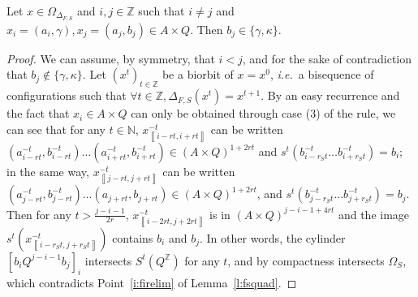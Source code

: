 \documentclass{jac}
\newcommand{\Z}{\mathbb Z}
\newcommand{\N}{\mathbb N}
\newcommand{\oo}[2]{\left\rrbracket #1,#2\right\llbracket}
\newcommand{\cc}[2]{\left\llbracket #1,#2\right\rrbracket}
\newcommand{\scc}[2]{_{\cc{#1}{#2}}}\newcommand{\soo}[2]{_{\oo{#1}{#2}}}\newcommand{\co}[2]{\left\llbracket #1,#2\right\llbracket}\newcommand{\sco}[2]{_{\co{#1}{#2}}}\newcommand{\kaprx}[1]{\mathcal A_{#1}}
\newcommand{\ie}{\textit{i.e.}\ }
\theoremstyle{definition}
\begin{document}
\begin{lem}\label{l:fire}
 Let $x\in\Omega_{\Delta_{F,S}}$ and $i,j\in\Z$ such that $i\ne j$ and $x_i=(a_i,\gamma),x_j=(a_j,b_j)\in A\times Q$.
Then $b_j\in\{\gamma,\kappa\}$.
\end{lem}
\begin{proof}
We can assume, by symmetry, that $i<j$, and for the sake of contradiction that $b_j\notin\{\gamma,\kappa\}$.
Let $(x^t)_{t\in\Z}$ be a biorbit of $x=x^0$, \ie a bisequence of configurations such that $\forall t\in\Z,\Delta_{F,S}(x^t)=x^{t+1}$. By an easy recurrence and the fact that $x_i\in A\times Q$ can only be obtained through case (3) of the rule, we can see that for any $t\in\N$, $x^{-t}\scc{i-rt}{i+rt}$ can be written $(a^{-t}_{i-rt},b^{-t}_{i-rt})\ldots(a^{-t}_{i+rt},b^{-t}_{i+rt})\in(A\times Q)^{1+2rt}$ and $s^t(b^{-t}_{i-r_St}\ldots b^{-t}_{i+r_St})=b_i$; in the same way, $x^{-t}\scc{j-rt}{j+rt}$ can be written $(a^{-t}_{j-rt},b^{-t}_{j-rt})\ldots(a_{j+rt},b_{j+rt})\in(A\times Q)^{1+2rt}$, and $s^t(b^{-t}_{j-r_St}\ldots b^{-t}_{j+r_St})=b_j$.
Then for any $t>\frac{j-i-1}{2r}$, $x^{-t}\scc{i-2rt}{j+2rt}$ is in $(A\times Q)^{j-i-1+4rt}$ and the image $s^t(x^{-t}\scc{i-r_St}{j+r_St})$ contains $b_i$ and $b_j$. In other words, the cylinder $[b_iQ^{j-i-1}b_j]_i$ intersects $S^t(Q^\Z)$ for any $t$, and by compactness intersects $\Omega_S$, which contradicts Point~\ref{i:firelim} of Lemma~\ref{l:fsquad}.
\end{proof}
\end{document}
